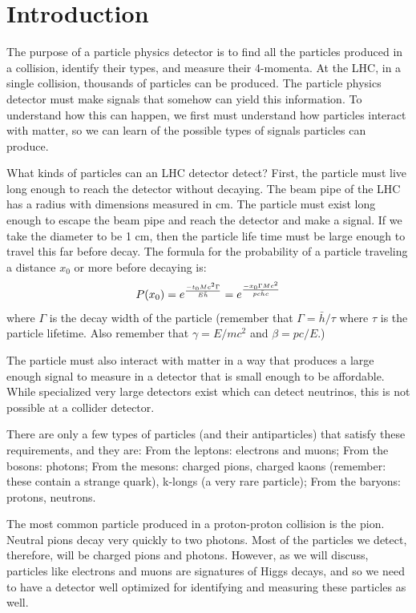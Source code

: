 
\section{Introduction}

The purpose of a particle physics detector is to find all the particles produced
in a collision, identify their types, and measure their 4-momenta.
At the LHC, in a single collision, thousands of particles can be produced.
The particle physics detector must make signals that somehow can yield this information.
To understand how this can happen, we first must understand how particles interact
with matter, so we can learn of the possible types of signals particles can produce.

What kinds of particles can an LHC detector detect?  First, the particle must live long 
enough to reach the detector without decaying.  The beam pipe of the LHC has a 
radius with dimensions measured in cm.  The particle must exist long enough to escape the beam pipe and
reach the detector and make a signal.  If we take the diameter to be 1 cm, then
the particle life time must be large enough to travel this far before decay.
The formula for the probability of a particle traveling a distance $x_0$ or more before decaying is:
\begin{equation}
P(x_0)=e^{-{t_0 Mc^2 \Gamma} \over {E \bar{h}}}=e^{{-x_0\Gamma Mc^2}\over{pc\bar{h}c}}
\end{equation}
where $\Gamma$ is the decay width of the particle (remember that $\Gamma=\bar{h}/\tau$ where $\tau$ is the particle lifetime. Also remember that $\gamma=E/mc^2$ and $\beta=pc/E$.)

The particle must also interact  with matter in a way that produces a large enough signal to measure in a detector that is small enough to be affordable.  While specialized very large detectors exist which can detect neutrinos, this is not possible at a collider detector.

There are only a few types of particles (and their antiparticles) that satisfy these requirements, and they are:  From the leptons: electrons and muons; From the bosons: photons; From the mesons:
charged pions, charged kaons (remember: these contain a strange quark), k-longs (a very rare particle); From the baryons: protons, neutrons.

The most common particle produced in a proton-proton collision is the pion.  Neutral pions decay very quickly to two photons. Most of the particles we detect, therefore, will be charged pions and photons.  However, as we will discuss, particles like electrons and muons are signatures of Higgs decays, and so we need to have a detector well optimized for identifying and measuring these particles as well.




